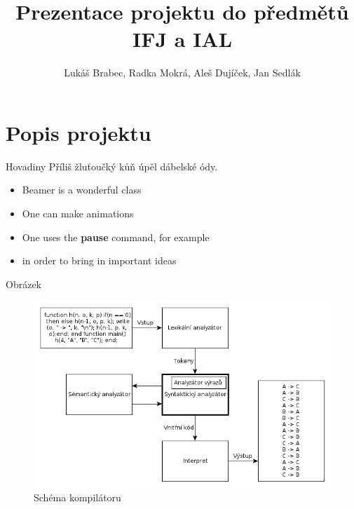 \documentclass{beamer}
\title[Prezentace do IFJ a IAL]{Prezentace projektu do předmětů IFJ a IAL}
\author{Lukáš Brabec, Radka Mokrá, Aleš Dujíček, Jan Sedlák}
\begin{document}
\begin{frame}
  \maketitle
\end{frame}
\section{Popis projektu}
\begin{frame}{Hovadiny}
  Příliš žluťoučký kůň úpěl dábelské ódy.
  \begin{itemize}
    \item Beamer is a wonderful class
    \item One can make animations
    \item One uses the \textbf{pause} command, for example
    \item in order to bring in important ideas
  \end{itemize}
\end{frame}

\begin{frame}{Obrázek}
    \begin{figure}
        \includegraphics[scale=0.45]{schema.png}
        \caption{Schéma kompilátoru}
    \end{figure}
\end{frame}
\end{document}

